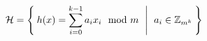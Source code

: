 \documentclass{article}
\begin{document}
\[
	\mathcal{H} =\Set{
		h(x)=\sum_{i=0}^{k-1}a_{i}x_{i}\mod m 
		\ | \
		a_{i}\in\mathbb{Z}_{m^{k}}
	}
\]
\end{document}
